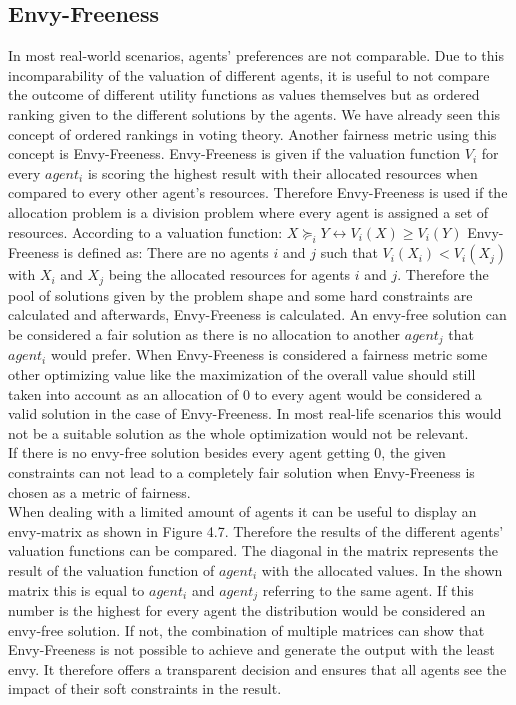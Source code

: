 \documentclass[german, a4paper, 11pt, oneside]{scrbook}
\begin{document}
\subsection{Envy-Freeness}
In most real-world scenarios, agents' preferences are not comparable.
Due to this incomparability of the valuation of different agents, it is useful to not compare the outcome of different utility functions as values themselves but as ordered ranking given to the different solutions by the agents. We have already seen this concept of ordered rankings in voting theory. Another fairness metric using this concept is Envy-Freeness. Envy-Freeness is given if the valuation function $V_i$ for every $agent_i$ is scoring the highest result with their allocated resources when compared to every other agent's resources. \cite{Plaut.15.07.2017} Therefore Envy-Freeness is used if the allocation problem is a division problem where every agent is assigned a set of resources.
According to a valuation function:
$X \succeq_i Y \leftrightarrow V_i(X) \geq V_i(Y)$
Envy-Freeness is defined as: There are no agents $i$ and $j$ such that
$V_i(X_i) < V_i(X_j)$
with $X_i$ and $X_j$ being the allocated resources for agents $i$ and $j$.
Therefore the pool of solutions given by the problem shape and some hard constraints are calculated and afterwards, Envy-Freeness is calculated. An envy-free solution can be considered a fair solution as there is no allocation to another $agent_j$ that $agent_i$ would prefer. \cite{Ek,Brandt, Plaut.15.07.2017} When Envy-Freeness is considered a fairness metric some other optimizing value like the maximization of the overall value should still taken into account as an allocation of 0 to every agent would be considered a valid solution in the case of Envy-Freeness. \cite{Bouveret} In most real-life scenarios this would not be a suitable solution as the whole optimization would not be relevant.
\\If there is no envy-free solution besides every agent getting 0, the given constraints can not lead to a completely fair solution when Envy-Freeness is chosen as a metric of fairness. \\When dealing with a limited amount of agents it can be useful to display an envy-matrix as shown in Figure 4.7. Therefore the results of the different agents' valuation functions can be compared. The diagonal in the matrix represents the result of the valuation function of $agent_i$ with the allocated values. In the shown matrix this is equal to $agent_i$ and $agent_j$ referring to the same agent. If this number is the highest for every agent the distribution would be considered an envy-free solution. If not, the combination of multiple matrices can show that Envy-Freeness is not possible to achieve and generate the output with the least envy. It therefore offers a transparent decision and ensures that all agents see the impact of their soft constraints in the result.\\ 
\end{document}
